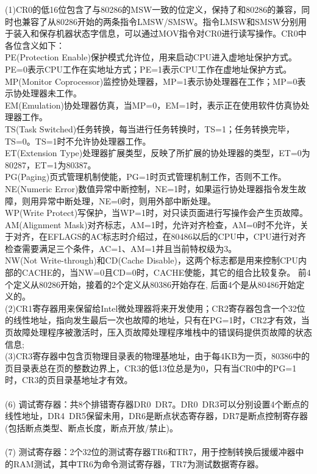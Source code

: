 \documentclass[12pt]{article}
\begin{document}
(1)CR0的低16位包含了与80286的MSW一致的位定义，保持了和80286的兼容，同时也兼容了从80286开始的两条指令LMSW/SMSW。指令LMSW和SMSW分别用于装入和保存机器状态字信息，可以通过MOV指令对CR0进行读写操作。CR0中各位含义如下：\\
PE(Protection Enable)保护模式允许位，用来启动CPU进入虚地址保护方式。PE=0表示CPU工作在实地址方式；PE=1表示CPU工作在虚地址保护方式。\\
MP(Monitor Coprocessor)监控协处理器，MP=1表示协处理器在工作；MP=0表示协处理器未工作。 \\
EM(Emulation)协处理器仿真，当MP=0，EM=1时，表示正在使用软件仿真协处理器工作。 \\
TS(Task Switched)任务转换，每当进行任务转换时，TS=1；任务转换完毕，TS=0。TS=1时不允许协处理器工作。  \\
ET(Extension Type)处理器扩展类型，反映了所扩展的协处理器的类型，ET=0为80287，ET=1为80387。 \\
PG(Paging)页式管理机制使能，PG=1时页式管理机制工作，否则不工作。\\
NE(Numeric Error)数值异常中断控制，NE=1时，如果运行协处理器指令发生故障，则用异常中断处理，NE=0时，则用外部中断处理。 \\
WP(Write Protect)写保护，当WP=1时，对只读页面进行写操作会产生页故障。\\
AM(Alignment Mask)对齐标志，AM=1时，允许对齐检查，AM=0时不允许，关于对齐，在EFLAGS的AC标志时介绍过，在80486以后的CPU中，CPU进行对齐检查需要满足三个条件，AC=1、AM=1并且当前特权级为3。 \\
NW(Not Write-through)和CD(Cache Disable)，这两个标志都是用来控制CPU内部的CACHE的，当NW=0且CD=0时，CACHE使能，其它的组合比较复杂。
前4个定义从80286开始，接着的2个定义从80386开始存在, 后面4个是从80486开始定义的。\\
(2)CR1寄存器用来保留给Intel微处理器将来开发使用；CR2寄存器包含一个32位的线性地址，指向发生最后一次也故障的地址，只有在PG=1时，CR2才有效，当页故障处理程序被激活时，压入页故障处理程序堆栈中的错误码提供页故障的状态信息;\\
(3)CR3寄存器中包含页物理目录表的物理基地址，由于每4KB为一页，80386中的页目录表总在页的整数边界上，CR3的低13位总是为0，只有当CR0中的PG=1时，CR3的页目录基地址才有效。\\\\
(6) 调试寄存器：共8个排错寄存器DR0~DR7。DR0~DR3可以分别设置4个断点的线性地址，DR4~DR5保留未用，DR6是断点状态寄存器，DR7是断点控制寄存器(包括断点类型、断点长度，断点开放/禁止)。\\\\
(7) 测试寄存器：2个32位的测试寄存器TR6和TR7，用于控制转换后援缓冲器中的RAM测试，其中TR6为命令测试寄存器，TR7为测试数据寄存器。
\end{document}
